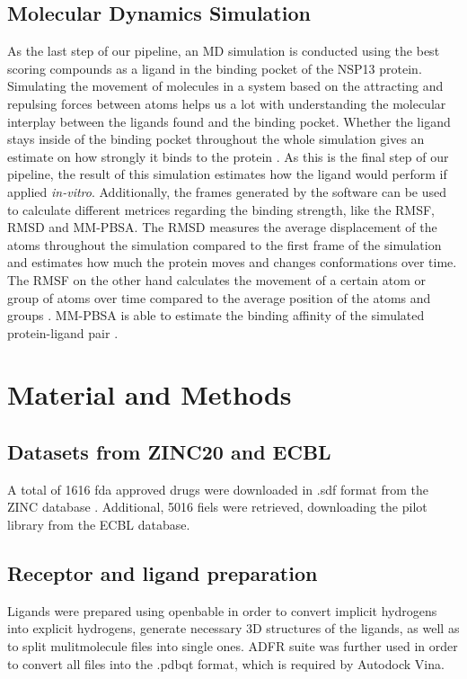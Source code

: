 \documentclass[11pt, letterpaper, titlepage]{article}
\renewcommand{\cite}{\parencite}
\begin{document}
\subsection{Molecular Dynamics Simulation}
As the last step of our pipeline, an \ac{MD} simulation is conducted using the best scoring compounds as a ligand in the binding pocket of the NSP13 protein. Simulating the movement of molecules in a system based on the attracting and repulsing forces between atoms helps us a lot with understanding the molecular interplay between the ligands found and the binding pocket. Whether the ligand stays inside of the binding pocket throughout the whole simulation gives an estimate on how strongly it binds to the protein \cite{MD_Basics}. As this is the final step of our pipeline, the result of this simulation estimates how the ligand would perform if applied \textit{in-vitro}. Additionally, the frames generated by the software can be used to calculate different metrices regarding the binding strength, like the \ac{RMSF}, \ac{RMSD} and \ac{MM-PBSA}. The \ac{RMSD} measures the average displacement of the atoms throughout the simulation compared to the first frame of the simulation and estimates how much the protein moves and changes conformations over time. The \ac{RMSF} on the other hand calculates the movement of a certain atom or group of atoms over time compared to the average position of the atoms and groups \cite{RMSD_RMSF}. \ac{MM-PBSA} is able to estimate the binding affinity of the simulated protein-ligand pair \cite{MM_PBSA}.


\section{Material and Methods}
\subsection{Datasets from ZINC20 and ECBL}
A total of 1616 fda approved drugs were downloaded in .sdf format from the ZINC database \cite{Irwin.2020}. Additional, 5016 fiels were retrieved, downloading the pilot library from the ECBL database.

\subsection{Receptor and ligand preparation}
Ligands were prepared using openbable in order to convert implicit hydrogens into explicit hydrogens, generate necessary 3D structures of the ligands, as well as to split mulitmolecule files into single ones. ADFR suite was further used in order to convert all files into the .pdbqt format, which is required by Autodock Vina. 
 
\end{document}
